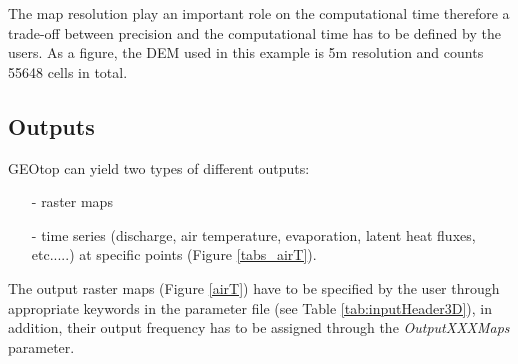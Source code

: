 The map resolution play an important role on the computational time therefore a trade-off between precision and the computational time has to be defined by the users. As a figure, the DEM used in this example is 5m resolution and counts 55648 cells in total.

\subsection{Outputs}
GEOtop can yield two types of different outputs:
\begin{itemize}
\item [-] raster maps
\item [-] time series (discharge, air temperature, evaporation, latent heat fluxes, etc.....) at specific points (Figure  \ref{tabs_airT}).
\end{itemize}
The output raster maps (Figure \ref{airT}) have to be specified by the user through appropriate keywords in the parameter file (see Table \ref{tab:inputHeader3D}), in addition, their output frequency has to be assigned through the {\it OutputXXXMaps} parameter.

